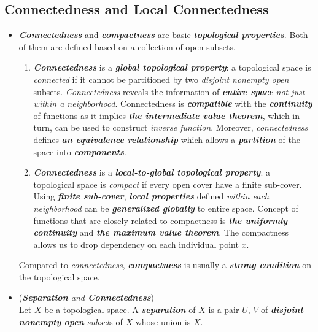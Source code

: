 \documentclass[11pt]{article}
\begin{document}
\subsection{Connectedness and Local Connectedness}
\begin{itemize}
\item  \begin{remark}
\emph{\textbf{Connectedness}} and \emph{\textbf{compactness}} are basic \emph{\textbf{topological properties}}. Both of them are defined based on a collection of open subsets. 
\begin{enumerate}
\item \emph{\textbf{Connectedness}} is a \emph{\textbf{global topological property}}: a topological space is \emph{connected} if it cannot be partitioned by two \emph{disjoint nonempty open} subsets. \emph{Connectedness} reveals the information of \emph{\textbf{entire space}} \emph{not just within a neighborhood}.  Connectedness is \emph{\textbf{compatible}} with the \emph{\textbf{continuity}} of functions as it implies \emph{\textbf{the intermediate value theorem}}, which in turn, can be used to construct \emph{inverse function}.  Moreover, \emph{connectedness} defines \emph{\textbf{an equivalence relationship}} which allows a \emph{\textbf{partition}} of the space into \emph{\textbf{components}}. 
\item \emph{\textbf{Connectedness}} is a \emph{\textbf{local-to-global topological property}}: a topological space is \emph{compact} if every open cover have a finite sub-cover. Using \emph{\textbf{finite sub-cover}}, \emph{\textbf{local properties}} defined \emph{within each neighborhood} can be \emph{\textbf{generalized globally}}  to entire space. Concept of functions that are closely related to compactness is \emph{\textbf{the uniformly continuity}} and \emph{\textbf{the maximum value theorem}}. The compactness allows us to drop dependency on each individual point $x$.
\end{enumerate}
Compared to \emph{connectedness}, \emph{\textbf{compactness}} is usually a \emph{\textbf{strong condition}} on the topological space.
\end{remark}




\item \begin{definition}(\emph{\textbf{Separation} and \textbf{Connectedness}})\\
Let $X$ be a topological space. A \emph{\textbf{separation}} of $X$ is a pair $U$, $V$ of \emph{\textbf{disjoint} \textbf{nonempty} \textbf{open} subset}s of $X$ whose union is $X$. 


\end{definition}
\end{itemize}
\end{document}
